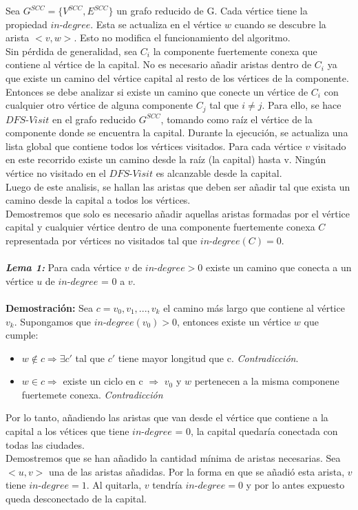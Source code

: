 \documentclass[a4paper,10pt]{article}
\begin{document}
	Sea $G^{SCC}=\{ V^{SCC},E^{SCC}\}$ un grafo reducido de G. Cada v\'ertice tiene la propiedad $in$-$degree$. Esta se actualiza en el v\'ertice $w$ cuando se descubre la arista $<v,w>$. Esto no modifica el funcionamiento del algoritmo.
	\\Sin p\'erdida de generalidad, sea $C_i$ la componente fuertemente conexa que contiene al v\'ertice de la capital. No es necesario añadir aristas dentro de $C_i$ ya que existe un camino del vértice capital al resto de los vértices de la componente. Entonces se debe analizar si existe un camino que conecte un v\'ertice de $C_i$ con cualquier otro v\'ertice de alguna componente $C_j$ tal que $i \neq j$. Para ello, se hace $DFS$-$Visit$ en el grafo reducido $G^{SCC}$, tomando como ra\'iz el v\'ertice de la componente donde se encuentra la capital. Durante la ejecución, se actualiza una lista global que contiene todos los v\'ertices visitados. Para cada vértice $v$ visitado en este recorrido existe un camino desde la raíz (la capital) hasta v. Ningún v\'ertice no visitado en el $DFS$-$Visit$ es alcanzable desde la capital.	  
	\\ Luego de este analisis, se hallan las aristas que deben ser a\~nadir tal que exista un camino desde la capital a todos los vértices.
	\\Demostremos que solo es necesario a\~nadir aquellas aristas formadas por el v\'ertice capital y cualquier v\'ertice dentro de una componente fuertemente conexa $C$ representada por v\'ertices no visitados tal que $in$-$degree(C) = 0$.
	\\\\\emph{\textbf{Lema 1:}} Para cada v\'ertice $v$ de $in$-$degree > 0$ existe un camino que conecta a un v\'ertice $u$ de $in$-$degree$ = 0 a $v$.
	\\\\\textbf{Demostraci\'on:} Sea $c = v_0, v_1, ..., v_k$ el camino m\'as largo que contiene al v\'ertice $v_k$. Supongamos que $in$-$degree(v_0) > 0$, entonces existe un v\'ertice $w$ que cumple:
	\begin{itemize}
		\item $w \notin c \Rightarrow \exists c'$ tal que $c'$ tiene mayor longitud que c. \emph{Contradicci\'on}.
		\item $w \in c \Rightarrow$ existe un ciclo en c $\Rightarrow$ $v_0$ y $w$ pertenecen a la misma componene fuertemete conexa. \emph{Contradicci\'on}
	\end{itemize}
	Por lo tanto, a\~nadiendo las aristas que van desde el v\'ertice que contiene a la capital a los v\'etices que tiene $in$-$degree$ = 0, la capital quedar\'ia conectada con todas las ciudades.
	\\Demostremos que se han a\~nadido la cantidad m\'inima de aristas necesarias. Sea $<u,v>$ una de las aristas a\~nadidas. Por la forma en que se añadió esta arista, $v$ tiene $in$-$degree = 1$. Al quitarla, $v$ tendr\'ia $in$-$degree = 0$ y por lo antes expuesto queda desconectado de la capital.  
\end{document}
